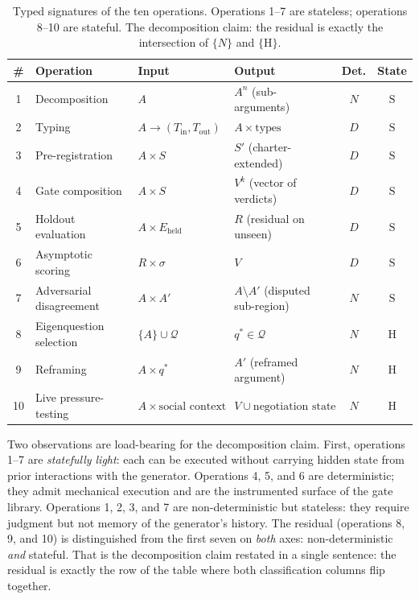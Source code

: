 \documentclass[11pt]{article}
\begin{document}
\begin{table}[H]
\centering
\small
\begin{tabular}{clllcc}
\toprule
\# & Operation & Input & Output & Det. & State \\
\midrule
1 & Decomposition & $A$ & $A^n$ (sub-arguments) & $N$ & $\mathrm{S}$ \\
2 & Typing & $A \to (T_{\text{in}}, T_{\text{out}})$ & $A \times \text{types}$ & $D$ & $\mathrm{S}$ \\
3 & Pre-registration & $A \times S$ & $S'$ (charter-extended) & $D$ & $\mathrm{S}$ \\
4 & Gate composition & $A \times S$ & $V^k$ (vector of verdicts) & $D$ & $\mathrm{S}$ \\
5 & Holdout evaluation & $A \times E_{\text{held}}$ & $R$ (residual on unseen) & $D$ & $\mathrm{S}$ \\
6 & Asymptotic scoring & $R \times \sigma$ & $V$ & $D$ & $\mathrm{S}$ \\
7 & Adversarial disagreement & $A \times A'$ & $A \setminus A'$ (disputed sub-region) & $N$ & $\mathrm{S}$ \\
8 & Eigenquestion selection & $\{A\} \cup \mathcal{Q}$ & $q^* \in \mathcal{Q}$ & $N$ & $\mathrm{H}$ \\
9 & Reframing & $A \times q^*$ & $A'$ (reframed argument) & $N$ & $\mathrm{H}$ \\
10 & Live pressure-testing & $A \times \text{social context}$ & $V \cup \text{negotiation state}$ & $N$ & $\mathrm{H}$ \\
\bottomrule
\end{tabular}
\caption{Typed signatures of the ten operations. Operations 1--7 are stateless; operations 8--10 are stateful. The decomposition claim: the residual is exactly the intersection of $\{N\}$ and $\{\mathrm{H}\}$.}
\end{table}

Two observations are load-bearing for the decomposition claim. First, operations 1--7 are \emph{statefully light}: each can be executed without carrying hidden state from prior interactions with the generator. Operations 4, 5, and 6 are deterministic; they admit mechanical execution and are the instrumented surface of the gate library. Operations 1, 2, 3, and 7 are non-deterministic but stateless: they require judgment but not memory of the generator's history. The residual (operations 8, 9, and 10) is distinguished from the first seven on \emph{both} axes: non-deterministic \emph{and} stateful. That is the decomposition claim restated in a single sentence: the residual is exactly the row of the table where both classification columns flip together.
\end{document}
